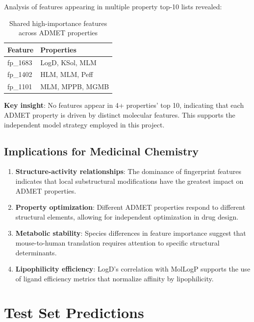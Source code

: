 \documentclass[11pt,a4paper]{article}
\newcommand{\admet}{ADMET}
\begin{document}
Analysis of features appearing in multiple property top-10 lists revealed:

\begin{table}[H]
\centering
\caption{Shared high-importance features across \admet{} properties}
\label{tab:shared_features}
\begin{tabular}{ll}
\toprule
\textbf{Feature} & \textbf{Properties} \\
\midrule
fp\_1683 & LogD, KSol, MLM \\
fp\_1402 & HLM, MLM, Peff \\
fp\_1101 & MLM, MPPB, MGMB \\
\bottomrule
\end{tabular}
\end{table}

\textbf{Key insight}: No features appear in 4+ properties' top 10, indicating that each \admet{} property is driven by distinct molecular features. This supports the independent model strategy employed in this project.

\subsection{Implications for Medicinal Chemistry}

\begin{enumerate}
    \item \textbf{Structure-activity relationships}: The dominance of fingerprint features indicates that local substructural modifications have the greatest impact on \admet{} properties.

    \item \textbf{Property optimization}: Different \admet{} properties respond to different structural elements, allowing for independent optimization in drug design.

    \item \textbf{Metabolic stability}: Species differences in feature importance suggest that mouse-to-human translation requires attention to specific structural determinants.

    \item \textbf{Lipophilicity efficiency}: LogD's correlation with MolLogP supports the use of ligand efficiency metrics that normalize affinity by lipophilicity.
\end{enumerate}

\section{Test Set Predictions}
\end{document}
